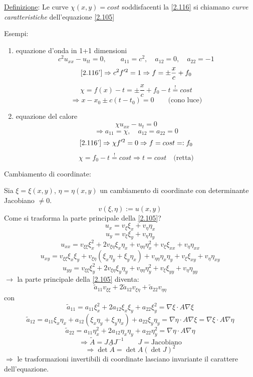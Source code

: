 \documentclass[a4paper,11pt]{report}
\begin{document}
\medskip

\underline{Definizione}: Le curve $\chi(x,y)=cost$ soddisfacenti la \eqref{2.116} si chiamano \emph{curve caratteristiche} dell'equazione \eqref{2.105}

Esempi:
\begin{enumerate}[label=(\roman*)]
\item equazione d'onda in 1+1 dimensioni
\[
c^2 u_{xx}-u_{tt}=0, \qquad a_{11}=c^2, \quad a_{12}=0, \quad a_{22}=-1
\]
\[
\eqref{2.116'}\Rightarrow c^2f'^2 =1 \Rightarrow f=\pm \frac{x}{c} + f_0
\]
\[
\chi=f(x) - t= \pm \frac{x}{c}+f_0 -t \overset{!}{=}cost
\]
\[
\Rightarrow x-x_0 \pm c(t-t_0)=0 \qquad \text{(cono luce)}
\]
\item equazione del calore 
\[
\chi u_{xx}- u_t=0
\]
\[
\Rightarrow a_{11}=\chi, \quad a_{12}=a_{22}=0
\]
\[
\eqref{2.116'} \Rightarrow \chi f'^2 =0 \Rightarrow f=cost=:f_0
\]
\[
\chi = f_0-t \overset{!}{=} cost \Rightarrow t = cost \quad \text{(retta)}
\]
\end{enumerate}
Cambiamento di coordinate:

Sia $\xi=\xi(x,y)$, $\eta=\eta(x,y)$ un cambiamento di coordinate con determinante Jacobiano $\neq 0$.
\[
v(\xi,\eta):=u(x,y)
\]
Come si trasforma la parte principale della \eqref{2.105}?
\[
u_x=v_\xi \xi_x + v_\eta \eta_x
\]
\[
u_y=v_\xi \xi_y + v_\eta \eta_y
\]
\[
u_{xx}=v_{\xi \xi}\xi_x^2 + 2v_{\xi\eta}\xi_x\eta_x + v_{\eta\eta}\eta_x^2 + v_\xi \xi_{xx} +v_\eta \eta_{xx}
\]
\[
u_{xy}= v_{\xi \xi}\xi_x\xi_y + v_{\xi\eta}(\xi_x\eta_y + \xi_y\eta_x) + v_{\eta\eta} \eta_x\eta_y + v_\xi \xi_{xy} + v_\eta \eta_{xy}
\]
\[
u_{yy}= v_{\xi\xi }\xi_y^2 + 2v_{\xi\eta}\xi_y\eta_y + v_{\eta\eta}\eta_y^2 + v_\xi \xi_{yy} + v_\eta \eta_{yy}
\]
$\rightarrow$ la parte principale della \eqref{2.105} diventa: 
\[
\tilde{a}_{11} v_{\xi\xi} + 2 \tilde{a}_{12}v_{\xi\eta} + \tilde{a}_{22}v_{\eta\eta}
\]
con 
\[
\tilde{a}_{11}= a_{11} \xi_x^2 + 2a_{12}\xi_x\xi_y + a_{22} \xi_y^2 = \nabla\xi \cdot A \nabla \xi
\]
\[
\tilde{a}_{12}= a_{11} \xi_x\eta_x + a_{12}(\xi_x\eta_y+\xi_y\eta_x) + a_{22} \xi_y\eta_y = \nabla \eta \cdot A\nabla \xi = \nabla \xi \cdot A \nabla \eta
\]
\[
\tilde{a}_{22}= a_{11} \eta_x^2 + 2a_{12}\eta_x\eta_y + a_{22} \eta_y^2 = \nabla \eta \cdot A \nabla \eta
\]
\begin{equation}
\Rightarrow \tilde{A} = J A J^{-1} \qquad J=\text{Jacobiano} 
\label{2.117}
\end{equation}
\[
\Rightarrow \det \tilde{A} = \det A (\det J)^2
\]
$\Rightarrow$ le trasformazioni invertibili di coordinate lasciano invariante il carattere dell'equazione.
\end{document}
